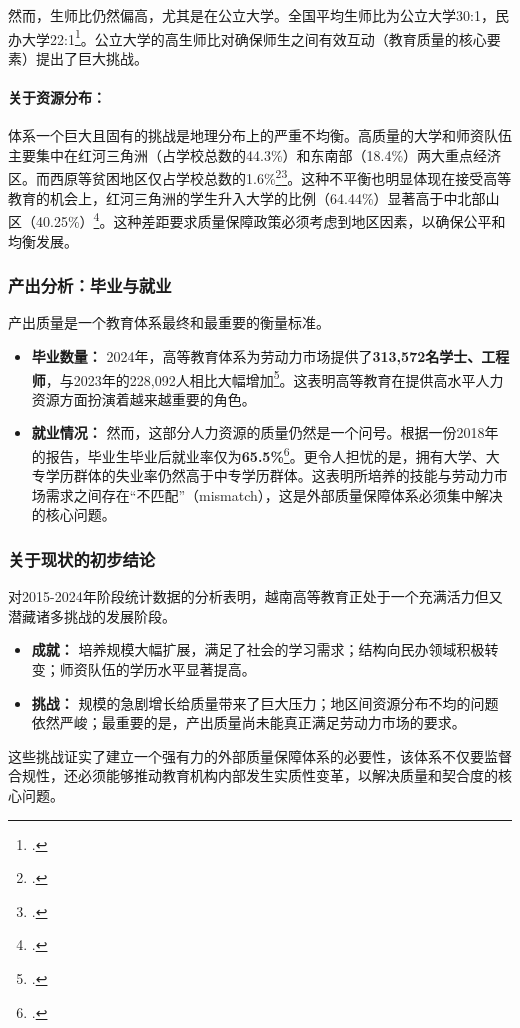 然而，生师比仍然偏高，尤其是在公立大学。全国平均生师比为公立大学30:1，民办大学22:1\footcite{stat_moet_2024}。公立大学的高生师比对确保师生之间有效互动（教育质量的核心要素）提出了巨大挑战。

\paragraph{关于资源分布：}
体系一个巨大且固有的挑战是地理分布上的严重不均衡。高质量的大学和师资队伍主要集中在红河三角洲（占学校总数的44.3\%）和东南部（18.4\%）两大重点经济区。而西原等贫困地区仅占学校总数的1.6\%\footcite{stat_quy_mo_2015_2021}\footcite{stat_phan_bo_dia_ly}。这种不平衡也明显体现在接受高等教育的机会上，红河三角洲的学生升入大学的比例（64.44\%）显著高于中北部山区（40.25\%）\footcite{stat_ty_le_vao_dh_2023}。这种差距要求质量保障政策必须考虑到地区因素，以确保公平和均衡发展。

\subsubsection{产出分析：毕业与就业}

产出质量是一个教育体系最终和最重要的衡量标准。
\begin{itemize}
    \item \textbf{毕业数量：} 2024年，高等教育体系为劳动力市场提供了\textbf{313,572名学士、工程师}，与2023年的228,092人相比大幅增加\footcite{stat_moet_2024}。这表明高等教育在提供高水平人力资源方面扮演着越来越重要的角色。
    \item \textbf{就业情况：} 然而，这部分人力资源的质量仍然是一个问号。根据一份2018年的报告，毕业生毕业后就业率仅为\textbf{65.5\%}\footcite{stat_that_nghiep_2018}。更令人担忧的是，拥有大学、大专学历群体的失业率仍然高于中专学历群体。这表明所培养的技能与劳动力市场需求之间存在“不匹配”（mismatch），这是外部质量保障体系必须集中解决的核心问题。
\end{itemize}

\subsubsection{关于现状的初步结论}
对2015-2024年阶段统计数据的分析表明，越南高等教育正处于一个充满活力但又潜藏诸多挑战的发展阶段。
\begin{itemize}
    \item \textbf{成就：} 培养规模大幅扩展，满足了社会的学习需求；结构向民办领域积极转变；师资队伍的学历水平显著提高。
    \item \textbf{挑战：} 规模的急剧增长给质量带来了巨大压力；地区间资源分布不均的问题依然严峻；最重要的是，产出质量尚未能真正满足劳动力市场的要求。
\end{itemize}
这些挑战证实了建立一个强有力的外部质量保障体系的必要性，该体系不仅要监督合规性，还必须能够推动教育机构内部发生实质性变革，以解决质量和契合度的核心问题。


